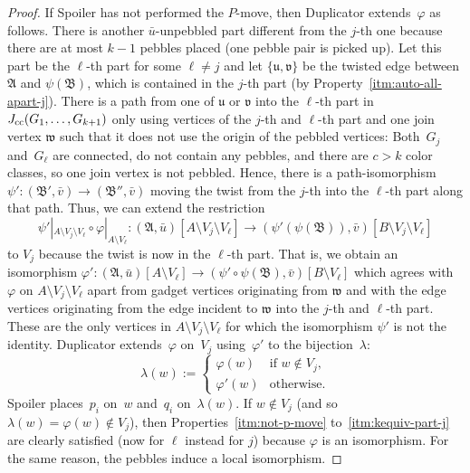 \documentclass[]{lmcs}
\renewcommand{\phi}{\varphi}
\newcommand{\set}[1]{\lbrace #1 \rbrace}
\newcommand{\auto}{\phi}
\newcommand{\autoA}{\phi}
\newcommand{\autoB}{\psi}
\newcommand{\tup}[1]{\bar{#1}}
\newcommand{\StructV}{A}
\newcommand{\vertA}{u}
\newcommand{\vertB}{v}
\newcommand{\vertC}{w}
\newcommand{\StructA}{\mathfrak{A}}
\newcommand{\StructB}{\mathfrak{B}}
\newcommand{\StructVA}{A}
\newcommand{\StructVB}{B}
\newcommand{\restrictVect}[2]{#1|_{#2}}
\newcommand{\gamebij}{\lambda}
\newcommand{\bVertA}{\mathfrak{u}}
\newcommand{\bVertB}{\mathfrak{v}}
\newcommand{\bVertC}{\mathfrak{w}}
\begin{document}
\begin{proof}
	
	If Spoiler has not performed the $P$-move,
	then Duplicator extends~$\auto$ as follows.
	There is another $\tup{\vertA}$-unpebbled part different from the $j$-th one
	because there are at most $k-1$ pebbles placed
	(one pebble pair is picked up).
	Let this part be the $\ell$-th part for some $\ell \neq j$
	and let $\set{\bVertA,\bVertB}$
	be the twisted edge between $\StructA$ and $\autoB(\StructB)$, which is contained in the $j$-th part (by Property~\ref{itm:auto-all-apart-j}).
	There is a path from one of $\bVertA$ or $\bVertB$
	into the $\ell$-th part in $J_{\text{cc}}(G_1, \dots, G_{k+1})$
	only using vertices of the $j$-th and $\ell$-th part and one join vertex $\bVertC$
	such that it does not use the origin of the pebbled vertices:
	Both~$G_j$ and~$G_\ell$ are connected, do not contain any pebbles,
	and there are $c > k$ color classes,
	so one join vertex is not pebbled.
	Hence, there is a path-isomorphism $\autoB' \colon (\StructB', \tup{\vertB}) \to (\StructB'', \tup{\vertB})$
	moving the twist from the $j$-th into the $\ell$-th part along that path.
	Thus, 
	we can extend the restriction \[\restrictVect{\autoB'}{\StructV \setminus V_j \setminus V_\ell}\circ\restrictVect{\auto}{\StructV \setminus V_\ell} \colon (\StructA, \tup{\vertA})[\StructVA \setminus V_j\setminus V_\ell] \to 
	(\autoB'(\autoB(\StructB)), \tup{\vertB})[\StructVB \setminus V_j\setminus V_\ell]\]
	to $V_j$ because the twist is now in the $\ell$-th part.
	That is, we obtain an isomorphism
	$\auto' \colon (\StructA, \tup{\vertA})[\StructVA \setminus V_\ell] \to 
	(\autoB'\circ\autoB(\StructB), \tup{\vertB})[\StructVB \setminus V_\ell]$
	which agrees with $\autoA$ on $\StructV\setminus V_j \setminus V_\ell$
	apart from gadget vertices originating from $\bVertC$
	and with the edge vertices originating from the edge incident to $\bVertC$
	into the $j$-th and $\ell$-th part.
	These are the only vertices in $\StructV \setminus V_j \setminus V_\ell$
	for which the isomorphism $\autoB'$ is not the identity.
	Duplicator extends~$\autoA$ on~$V_j$ using~$\autoA'$ to the bijection~$\gamebij$:
	\[\gamebij(\vertC) := \begin{cases}
		\autoA(\vertC) & \text{if } \vertC \notin V_j,\\
		\autoA' (\vertC) &\text{otherwise.}
	\end{cases}\]
	Spoiler places~$p_i$ on~$\vertC$ and~$q_i$ on~$\gamebij(\vertC)$.
	If $\vertC \notin V_j$
	(and so $\gamebij(\vertC)=\autoA(\vertC) \notin V_j$),
	then Properties~\ref{itm:not-p-move} to~\ref{itm:kequiv-part-j} are clearly satisfied (now for $\ell$ instead for $j$)
	because $\autoA$ is an isomorphism.
	For the same reason, the pebbles induce a local isomorphism.


\end{proof}
\end{document}

